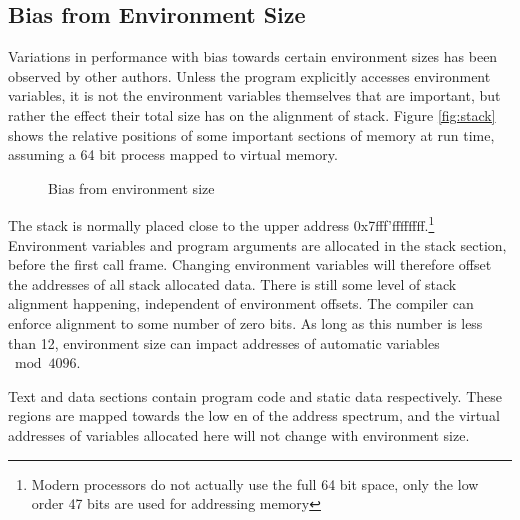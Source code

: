 \documentclass[a4paper,11pt,twocolumn,twoside]{article}
\begin{document}
\subsection{Bias from Environment Size}
Variations in performance with bias towards certain environment sizes has been observed by other authors.
Unless the program explicitly accesses environment variables, it is not the environment variables themselves that are important, but rather the effect their total size has on the alignment of stack. 
Figure \ref{fig:stack} shows the relative positions of some important sections of memory at run time, assuming a 64 bit process mapped to virtual memory. 

\begin{figure*}[t]
  \caption{Bias from environment size}
\end{figure*}

The stack is normally placed close to the upper address 0x7fff'ffffffff.\footnote{Modern processors do not actually use the full 64 bit space, only the low order 47 bits are used for addressing memory}
Environment variables and program arguments are allocated in the stack section, before the first call frame.
Changing environment variables will therefore offset the addresses of all stack allocated data.
There is still some level of stack alignment happening, independent of environment offsets. 
The compiler can enforce alignment to some number of zero bits.
As long as this number is less than 12, environment size can impact addresses of automatic variables $\bmod 4096$.

Text and data sections contain program code and static data respectively.
These regions are mapped towards the low en of the address spectrum, and the virtual addresses of variables allocated here will not change with environment size. 
\end{document}
